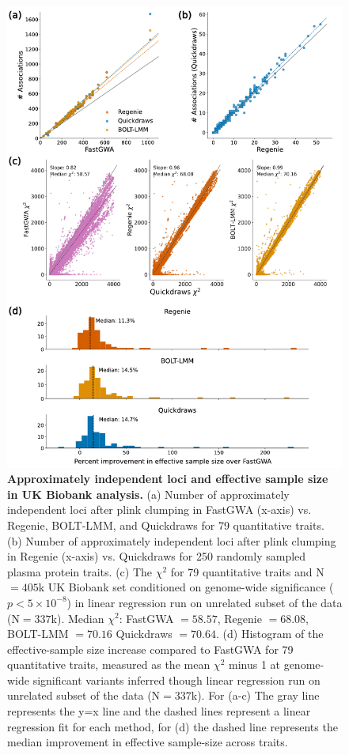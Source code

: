 \begin{figure}[h!]
    \centering
    \includegraphics[scale=0.7]{figures/qd_panel_loci.pdf}
    \caption{\textbf{Approximately independent loci and effective sample size in UK Biobank analysis.} (a) Number of approximately independent loci after plink clumping in FastGWA (x-axis) vs. Regenie, BOLT-LMM, and Quickdraws for 79 quantitative traits. (b) Number of approximately independent loci after plink clumping in Regenie (x-axis) vs. Quickdraws for 250 randomly sampled plasma protein traits. (c) The $\chi^2$ for 79 quantitative traits and N$=405$k UK Biobank set conditioned on genome-wide significance ($p < 5 \times 10^{-8}$) in linear regression run on unrelated subset of the data (N$=337$k). Median $\chi^2$: FastGWA $= 58.57$, Regenie $= 68.08$, BOLT-LMM $= 70.16$ Quickdraws $= 70.64$. (d) Histogram of the effective-sample size increase compared to FastGWA for 79 quantitative traits, measured as the mean $\chi^2$ minus 1 at genome-wide significant variants inferred though linear regression run on unrelated subset of the data (N$=337$k). For (a-c) The gray line represents the y=x line and the dashed lines represent a linear regression fit for each method, for (d) the dashed line represents the median improvement in effective sample-size across traits.}
    \label{fig:ukb_indep}
\end{figure}

